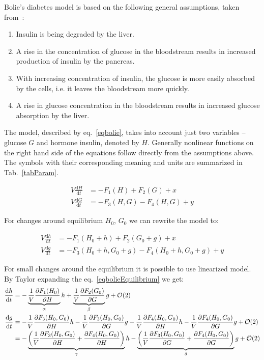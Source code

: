 \documentclass{article}
\providecommand{\m}[1]{\ensuremath{\mathrm{#1}}}
\providecommand{\p}[1]{\ensuremath{\partial #1}}
\begin{document}
Bolie's diabetes model is based on the following general assumptions, taken from~\cite{fulford_modelling_1997}:

\begin{enumerate}
	\item
	Insulin is being degraded by the liver.	
	\item
	A rise in the concentration of glucose in the bloodstream results in increased production of insulin by the pancreas.
	\item
	With increasing concentration of insulin, the glucose is more easily absorbed by the cells, i.e. it leaves the bloodstream more quickly.
	\item
	A rise in glucose concentration in the bloodstream results in increased glucose absorption by the liver.

\end{enumerate}


The model, described by eq.~\ref{eqbolie}, takes into account just two variables -- glucose $G$ and hormone insulin, denoted by $H$. Generally nonlinear functions on the right hand side of the equations follow directly from the assumptions above. The symbols with their corresponding meaning and units are summarized in Tab.~\ref{tabParam}. 

\begin{equation}
\label{eqbolie}
\begin{aligned}
V\frac{\m{d} H}{\m{d} t}&=-F_1(H)+F_2(G)+ x\\
V\frac{\m{d} G}{\m{d} t}&=-F_3(H,G)-F_4(H,G) + y 
\end{aligned}
\end{equation}

For changes around equilibrium $H_0$, $G_0$ we can rewrite the model to:

\begin{equation}
\label{eqbolieEquilibrium}
\begin{aligned}
V\frac{\m{d}h}{\m{d}t}&=-F_1(H_0+h)+F_2(G_0+g)+ x\\
V\frac{\m{d}g}{\m{d}t}&=-F_3(H_0+h,G_0+g)-F_4(H_0+h,G_0+g)+ y
\end{aligned}
\end{equation}

For small changes around the equilibrium it is possible to use linearized model. By Taylor expanding the eq.~\ref{eqbolieEquilibrium} we get:
\begin{align*}
\frac{\m{d}h}{\m{d}t}&=-\underbrace{%
		\frac{1}{V}\frac{\p F_1(H_0)}{\p H}}_{\alpha}h+%
%
\underbrace{%
		\frac{1}{V}\frac{\p F_2(G_0)}{\p G}}_{\beta}g+\mathcal{O}(2) \\%
%
\frac{\m{d}g}{\m{d}t}&=-\frac{1}{V}\frac{\p F_3(H_0, G_0)}{\p H}h- \frac{1}{V}\frac{\p F_3(H_0, G_0)}{\p G}g-\frac{1}{V}\frac{\p F_4(H_0, G_0)}{\p H}h-\frac{1}{V}\frac{\p F_4(H_0, G_0)}{\p G}g+\mathcal{O}(2)\\%
%
&=-\underbrace{%
\left(\frac{1}{V}\frac{\p F_3(H_0, G_0)}{\p H}+\frac{\p F_4(H_0, G_0)}{\p H}\right)}_{\gamma}h%
-\underbrace{%
\left(\frac{1}{V}\frac{\p F_3(H_0, G_0)}{\p G}+\frac{\p F_4(H_0, G_0)}{\p G}\right)}_{\delta} g+\mathcal{O}(2)\end{align*}
\end{document}

